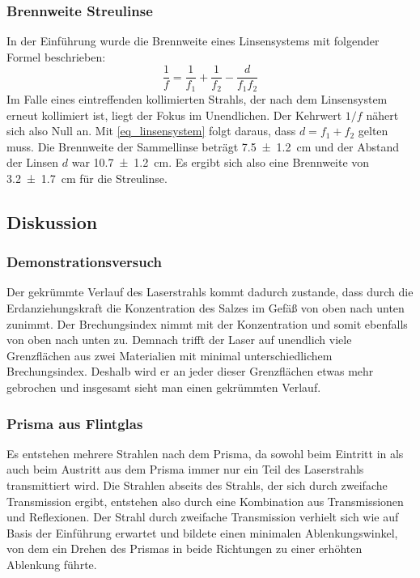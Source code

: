 \documentclass[
	a4paper,
	12pt,
	pagesize,
	ngerman
]{scrartcl}
\begin{document}
	\subsubsection{Brennweite Streulinse}
	In der Einführung wurde die Brennweite eines Linsensystems mit folgender Formel beschrieben:
	\begin{equation}
		\frac{1}{f} = \frac{1}{f_1} + \frac{1}{f_2} - \frac{d}{f_1 f_2}
		\label{eq_linsensystem}
	\end{equation}
	Im Falle eines eintreffenden kollimierten Strahls, der nach dem Linsensystem erneut kollimiert ist, liegt der Fokus im Unendlichen.
	Der Kehrwert $1/f$ nähert sich also Null an.
	Mit \cref{eq_linsensystem} folgt daraus, dass $d = f_1 + f_2$ gelten muss.
	Die Brennweite der Sammellinse beträgt \SI{7,5+-1,2}{cm} und der Abstand der Linsen $d$ war \SI{10,7 +- 1,2}{cm}.
	Es ergibt sich also eine Brennweite von \SI{3,2+-1,7}{cm} für die Streulinse.
	\subsection{Diskussion}
	\subsubsection{Demonstrationsversuch}
	Der gekrümmte Verlauf des Laserstrahls kommt dadurch zustande, dass durch die Erdanziehungskraft die Konzentration des Salzes im Gefäß von oben nach unten zunimmt.
	Der Brechungsindex nimmt mit der Konzentration und somit ebenfalls von oben nach unten zu. %
	Demnach trifft der Laser auf unendlich viele Grenzflächen aus zwei Materialien mit minimal unterschiedlichem Brechungsindex.
	Deshalb wird er an jeder dieser Grenzflächen etwas mehr gebrochen und insgesamt sieht man einen gekrümmten Verlauf.
	\subsubsection{Prisma aus Flintglas}
	Es entstehen mehrere Strahlen nach dem Prisma, da sowohl beim Eintritt in als auch beim Austritt aus dem Prisma immer nur ein Teil des Laserstrahls transmittiert wird.
	Die Strahlen abseits des Strahls, der sich durch zweifache Transmission ergibt, entstehen also durch eine Kombination aus Transmissionen und Reflexionen.
	Der Strahl durch zweifache Transmission verhielt sich wie auf Basis der Einführung erwartet und bildete einen minimalen Ablenkungswinkel, von dem ein Drehen des Prismas in beide Richtungen zu einer erhöhten Ablenkung führte. %
	
\end{document}

